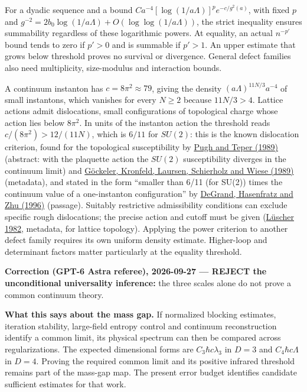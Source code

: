 \documentclass[11pt,a4paper]{article}
\begin{document}
For a dyadic sequence and a bound
\(C a^{-4}[\log(1/a\Lambda)]^p e^{-c/g^2(a)}\), with fixed \(p\) and
\(g^{-2}=2b_0\log(1/a\Lambda)+O(\log\log(1/a\Lambda))\), the strict
inequality ensures summability regardless of these logarithmic powers.
At equality, an actual \(n^{-p'}\) bound tends to zero if \(p'>0\) and
is summable if \(p'>1\). An upper estimate that grows below threshold
proves no survival or divergence. General defect families also need
multiplicity, size-modulus and interaction bounds.

A continuum instanton has \(c=8\pi^2\approx79\), giving the density
\((a\Lambda)^{11N/3}a^{-4}\) of small instantons, which vanishes for
every \(N\ge2\) because \(11N/3>4\). Lattice actions admit dislocations,
small configurations of topological charge whose action lies below
\(8\pi^2\). In units of the instanton action the threshold reads
\(c/(8\pi^2)>12/(11N)\), which is \(6/11\) for \(SU(2)\): this is the
known dislocation criterion, found for the topological susceptibility by
\href{https://doi.org/10.1016/0370-2693(89)91067-8}{Pugh and Teper
(1989)} (abstract: with the plaquette action the \(SU(2)\)
susceptibility diverges in the continuum limit) and
\href{https://doi.org/10.1016/0370-2693(89)90640-0}{Göckeler, Kronfeld,
Laursen, Schierholz and Wiese (1989)} (metadata), and stated in the form
``smaller than 6/11 (for SU(2)) times the continuum value of a
one-instanton configuration'' by
\href{https://doi.org/10.1016/0550-3213(96)00301-X}{DeGrand, Hasenfratz
and Zhu (1996)} (passage). Suitably restrictive admissibility conditions
can exclude specific rough dislocations; the precise action and cutoff
must be given (\href{https://doi.org/10.1007/BF02029132}{Lüscher 1982},
metadata, for lattice topology). Applying the power criterion to another
defect family requires its own uniform density estimate. Higher-loop and
determinant factors matter particularly at the equality threshold.

\textbf{Correction (GPT-6 Astra referee), 2026-09-27 --- REJECT the
unconditional universality inference:} the three scales alone do not
prove a common continuum theory.

\textbf{What this says about the mass gap.} If normalized blocking
estimates, iteration stability, large-field entropy control and
continuum reconstruction identify a common limit, its physical spectrum
can then be compared across regularizations. The expected dimensional
forms are \(C_3\hbar c\lambda_3\) in \(D=3\) and \(C_4\hbar c\Lambda\)
in \(D=4\). Proving the required common limit and its positive infrared
threshold remains part of the mass-gap map. The present error budget
identifies candidate sufficient estimates for that work.
\end{document}
